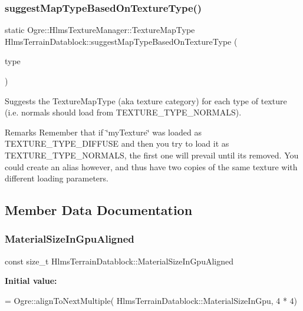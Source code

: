 \subsubsection{\texorpdfstring{suggest\+Map\+Type\+Based\+On\+Texture\+Type()}{suggestMapTypeBasedOnTextureType()}}
{\footnotesize\ttfamily static Ogre\+::\+Hlms\+Texture\+Manager\+::\+Texture\+Map\+Type Hlms\+Terrain\+Datablock\+::suggest\+Map\+Type\+Based\+On\+Texture\+Type (\begin{DoxyParamCaption}\item[{Terrain\+Texture\+Types}]{type }\end{DoxyParamCaption})\hspace{0.3cm}{\ttfamily [static]}}

Suggests the Texture\+Map\+Type (aka texture category) for each type of texture (i.\+e. normals should load from T\+E\+X\+T\+U\+R\+E\+\_\+\+T\+Y\+P\+E\+\_\+\+N\+O\+R\+M\+A\+LS). \begin{DoxyRemark}{Remarks}
Remember that if \char`\"{}my\+Texture\char`\"{} was loaded as T\+E\+X\+T\+U\+R\+E\+\_\+\+T\+Y\+P\+E\+\_\+\+D\+I\+F\+F\+U\+SE and then you try to load it as T\+E\+X\+T\+U\+R\+E\+\_\+\+T\+Y\+P\+E\+\_\+\+N\+O\+R\+M\+A\+LS, the first one will prevail until it\textquotesingle{}s removed. You could create an alias however, and thus have two copies of the same texture with different loading parameters. 
\end{DoxyRemark}


\subsection{Member Data Documentation}
\mbox{\label{class_hlms_terrain_datablock_aec560f7f77c262c7e9aec67ed39f64f4}} 
\subsubsection{\texorpdfstring{Material\+Size\+In\+Gpu\+Aligned}{MaterialSizeInGpuAligned}}
{\footnotesize\ttfamily const size\+\_\+t Hlms\+Terrain\+Datablock\+::\+Material\+Size\+In\+Gpu\+Aligned\hspace{0.3cm}{\ttfamily [static]}}

{\bfseries Initial value\+:}
\begin{DoxyCode}
= Ogre::alignToNextMultiple(
        HlmsTerrainDatablock::MaterialSizeInGpu,
        4 * 4)
\end{DoxyCode}



